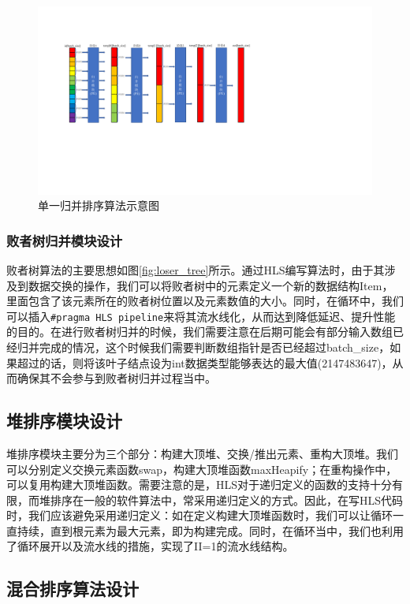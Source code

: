 \begin{figure}[htbp]
    \centering
    \includegraphics[width=\linewidth]{figures/merge_sort.pdf}
    \caption{单一归并排序算法示意图}
    \label{fig:merge_sort}
\end{figure}

\subsubsection{败者树归并模块设计}

败者树算法的主要思想如图\ref{fig:loser_tree}所示。通过HLS编写算法时，由于其涉及到数据交换的操作，我们可以将败者树中的元素定义一个新的数据结构Item，里面包含了该元素所在的败者树位置以及元素数值的大小。同时，在循环中，我们可以插入\verb|#pragma HLS pipeline|来将其流水线化，从而达到降低延迟、提升性能的目的。在进行败者树归并的时候，我们需要注意在后期可能会有部分输入数组已经归并完成的情况，这个时候我们需要判断数组指针是否已经超过batch\_size，如果超过的话，则将该叶子结点设为int数据类型能够表达的最大值(2147483647)，从而确保其不会参与到败者树归并过程当中。
\subsection{堆排序模块设计}
堆排序模块主要分为三个部分：构建大顶堆、交换/推出元素、重构大顶堆。我们可以分别定义交换元素函数swap，构建大顶堆函数maxHeapify；在重构操作中，可以复用构建大顶堆函数。需要注意的是，HLS对于递归定义的函数的支持十分有限，而堆排序在一般的软件算法中，常采用递归定义的方式。因此，在写HLS代码时，我们应该避免采用递归定义：如在定义构建大顶堆函数时，我们可以让循环一直持续，直到根元素为最大元素，即为构建完成。同时，在循环当中，我们也利用了循环展开以及流水线的措施，实现了II=1的流水线结构。

\subsection{混合排序算法设计}



